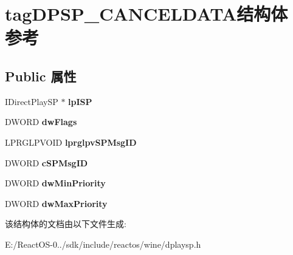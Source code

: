 \hypertarget{structtag_d_p_s_p___c_a_n_c_e_l_d_a_t_a}{}\section{tag\+D\+P\+S\+P\+\_\+\+C\+A\+N\+C\+E\+L\+D\+A\+T\+A结构体 参考}
\label{structtag_d_p_s_p___c_a_n_c_e_l_d_a_t_a}
\subsection*{Public 属性}
\begin{DoxyCompactItemize}
\item 
\mbox{\label{structtag_d_p_s_p___c_a_n_c_e_l_d_a_t_a_af25506b6107dbd5b515089bcbf40cd8c}} 
I\+Direct\+Play\+SP $\ast$ {\bfseries lp\+I\+SP}
\item 
\mbox{\label{structtag_d_p_s_p___c_a_n_c_e_l_d_a_t_a_a69c95610dea980dcb960e8a4126a6759}} 
D\+W\+O\+RD {\bfseries dw\+Flags}
\item 
\mbox{\label{structtag_d_p_s_p___c_a_n_c_e_l_d_a_t_a_aad5b7b8e78271a062e659019c9212f35}} 
L\+P\+R\+G\+L\+P\+V\+O\+ID {\bfseries lprglpv\+S\+P\+Msg\+ID}
\item 
\mbox{\label{structtag_d_p_s_p___c_a_n_c_e_l_d_a_t_a_a9a72609f280ef9450afb4515e84c35e8}} 
D\+W\+O\+RD {\bfseries c\+S\+P\+Msg\+ID}
\item 
\mbox{\label{structtag_d_p_s_p___c_a_n_c_e_l_d_a_t_a_a6a4e209b14b1665523aa5c3bfd6fa2b8}} 
D\+W\+O\+RD {\bfseries dw\+Min\+Priority}
\item 
\mbox{\label{structtag_d_p_s_p___c_a_n_c_e_l_d_a_t_a_a9a2383d026af04efe4e7868a326359d8}} 
D\+W\+O\+RD {\bfseries dw\+Max\+Priority}
\end{DoxyCompactItemize}


该结构体的文档由以下文件生成\+:\begin{DoxyCompactItemize}
\item 
E\+:/\+React\+O\+S-\/0../sdk/include/reactos/wine/dplaysp.\+h\end{DoxyCompactItemize}

